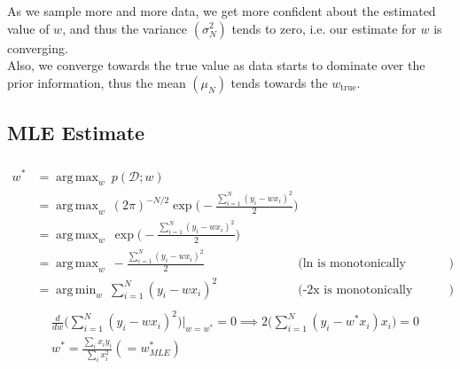 \documentclass[12pt, fleqn]{article}
\DeclareMathOperator*{\argmax}{arg\,max}
\DeclareMathOperator*{\argmin}{arg\,min}
\begin{document}
\subsubsection{}
As we sample more and more data, we get more confident about the estimated value of $w$, and thus the variance $(\sigma_N^2)$ tends to zero, i.e. our estimate for $w$ is converging. \\
Also, we converge towards the true value as data starts to dominate over the prior information, thus the mean $(\mu_N)$ tends towards the $w_{\text{true}}$.

\subsection{MLE Estimate}
\subsubsection{}
\begin{equation*}
  \begin{aligned}
    w^* & = \argmax_w \ p(\mathcal{D}; w)                                                                                                            \\
        & = \argmax_w \ (2 \pi)^{-N/2} \exp \bigg( -\frac{\sum_{i=1}^N (y_i - wx_i)^2}{2} \bigg)                                                     \\
        & = \argmax_w \ \exp \bigg( -\frac{\sum_{i=1}^N (y_i - wx_i)^2}{2} \bigg)                                                                    \\
        & = \argmax_w \ -\frac{\sum_{i=1}^N (y_i - wx_i)^2}{2}                                   & \text{(ln is monotonically increasing function})  \\
        & = \argmin_w \ \sum_{i=1}^N (y_i - wx_i)^2                                              & \text{(-2x is monotonically decreasing function}) \\
  \end{aligned}
\end{equation*}
\begin{equation*}
  \begin{aligned}
     & \frac{d}{dw} \bigg( \sum_{i=1}^N (y_i - wx_i)^2 \bigg) \bigg\vert_{w=w^*} = 0 \implies 2 \bigg( \sum_{i=1}^N (y_i - w^* x_i) x_i \bigg) = 0 \\
     & w^* = \frac{\sum_i x_i y_i}{\sum_i x_i^2} (= w^*_{MLE})
  \end{aligned}
\end{equation*}
\end{document}
